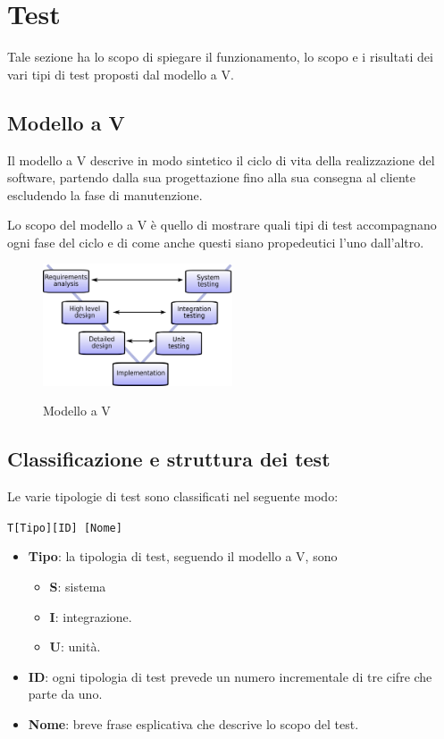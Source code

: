 \section{Test} \label{test}

Tale sezione ha lo scopo di spiegare il funzionamento, lo scopo e i risultati dei vari tipi di test proposti dal modello a V.

\subsection{Modello a V}
Il modello a V descrive in modo sintetico il ciclo di vita della realizzazione del software, partendo dalla sua progettazione fino alla sua consegna al cliente escludendo la fase di manutenzione.

Lo scopo del modello a V è quello di mostrare quali tipi di test accompagnano ogni fase del ciclo e di come anche questi siano propedeutici l'uno dall'altro.

\begin{figure}[H]
	\centering
	\includegraphics[width=0.5\textwidth]{img/V-model.png}
	\label{img:vmodel}
	\caption{Modello a V\protect\footnotemark}
\end{figure}


\subsection{Classificazione e struttura dei test}
Le varie tipologie di test sono classificati nel seguente modo:

\begin{center}
	\texttt{T[Tipo][ID] [Nome]}
\end{center}

\begin{itemize}
	\item \textbf{Tipo}: la tipologia di test, seguendo il modello a V, sono
	\begin{itemize}
		\item \textbf{S}: sistema
		\item \textbf{I}: integrazione.
		\item \textbf{U}: unità.
	\end{itemize}
	\item \textbf{ID}: ogni tipologia di test prevede un numero incrementale di tre cifre che parte da uno.
	\item \textbf{Nome}: breve frase esplicativa che descrive lo scopo del test.
\end{itemize}

